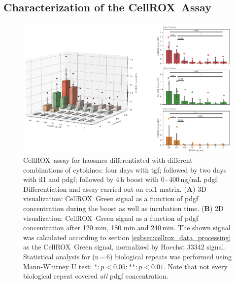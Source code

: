     \subsection{Characterization of the CellROX\texttrademark~Assay}
    \begin{figure}[h!]
    \capstart
        \centering
    	\includegraphics{Abbildung/CellROX_titration_no_norm.pdf}

    	\begin{minipage}{\captionwidth}
    		\caption[cellROX_titration]{ \newline
            CellROX\texttrademark~assay for \acp{haosmc} differentiated with different combinations of cytokines: four days with \ac{tgf}; followed by two days with \ac{il1} and \ac{pdgf}; followed by 4\,h boost with 0\,-\,400\,ng/mL \ac{pdgf}. Differentiation and assay carried out on \ac{col1} matrix.
            (\textbf{A}) 3D visualization: CellROX\texttrademark~Green signal as a function of \ac{pdgf} concentration during the boost as well as incubation time.
            (\textbf{B}) 2D visualization: CellROX\texttrademark~Green signal as a function of \ac{pdgf} concentration after 120 min, 180 min and 240\,min.
            The shown signal was calculated according to section \ref{subsec:cellrox_data_processing} as the CellROX\texttrademark~Green signal, normalized by Hoechst 33342 signal. Statistical analysis for (n\,=\,6) biological repeats was performed using Mann-Whitney U test: $*: p < 0.05; **: p < 0.01$. Note that not every biological repeat covered \textit{all} \ac{pdgf} concentration. }
    		\label{fig:cellROX_titration}
    	\end{minipage}
    \end{figure}

